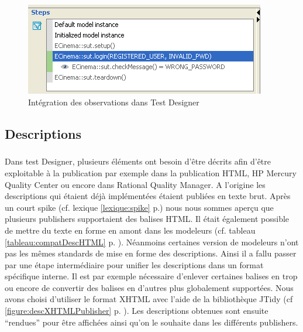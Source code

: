 \begin{figure}[!ht]
\centering
\includegraphics[scale=0.5]{Illustrations/Observation.png}
\caption{Intégration des observations dans Test Designer}
\label{figure:obsTD}
\end{figure}

\subsection{Descriptions}

\subparagraph*{}
Dans test Designer, plusieurs éléments ont besoin d'être décrits afin d'être exploitable à la publication par exemple dans la publication HTML, HP Mercury Quality Center ou encore dans Rational Quality Manager. A l'origine les descriptions qui étaient déjà implémentées étaient publiées en texte brut. Après un court spike (cf. lexique \ref{lexique:spike} p.\pageref{lexique:spike}) nous nous sommes aperçu que plusieurs publishers supportaient des balises HTML. Il était également possible de mettre du texte en forme en amont dans les modeleurs (cf. tableau \ref{tableau:compatDescHTML} p. \pageref{tableau:compatDescHTML}). Néanmoins certaines version de modeleurs n'ont pas les mêmes standards de mise en forme des descriptions. Ainsi il a fallu passer par une étape intermédiaire pour unifier les descriptions dans un format spécifique interne. Il est par exemple nécessaire d'enlever certaines balises en trop ou encore de convertir des balises en d'autres plus globalement supportées. Nous avons choisi d'utiliser le format XHTML avec l'aide de la bibliothèque JTidy (cf \ref{figure:descXHTMLPublisher} p. \pageref{figure:descXHTMLPublisher}). Les descriptions obtenues sont ensuite ``rendues'' pour être affichées ainsi qu'on le souhaite dans les différents publishers.

